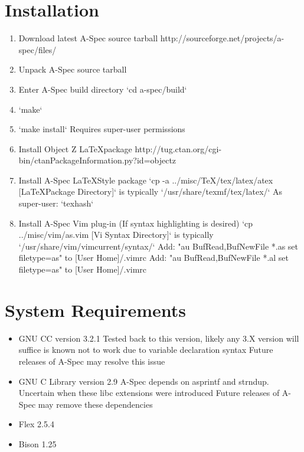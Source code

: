 \documentclass[letterpaper,10pt,draft]{book}
\begin{document}
\section{Installation}
   \label{sect:Install}

\begin{enumerate}
   \item Download latest A-Spec source tarball
      \subitem http://sourceforge.net/projects/a-spec/files/
   \item Unpack A-Spec source tarball
   \item Enter A-Spec build directory
      \subitem `cd a-spec/build`
   \item `make`
   \item `make install`
      \subitem Requires super-user permissions
   \item Install Object Z \LaTeX package
      \subitem http://tug.ctan.org/cgi-bin/ctanPackageInformation.py?id=objectz
   \item Install A-Spec \LaTeX Style package
      \subitem `cp -a ../misc/TeX/tex/latex/atex [\LaTeX Package Directory]`
       is typically `/usr/share/texmf/tex/latex/`
      \subitem As super-user: `texhash`
   \item Install A-Spec Vim plug-in (If syntax highlighting is desired)
      \subitem `cp ../misc/vim/as.vim [Vi Syntax Directory]`
       is typically `/usr/share/vim/vimcurrent/syntax/`
      \subitem Add: "au BufRead,BufNewFile *.as set filetype=as" to [User Home]/.vimrc
      \subitem Add: "au BufRead,BufNewFile *.al set filetype=as" to [User Home]/.vimrc
\end{enumerate}

\section{System Requirements}
   \label{sect:SysReq}

\begin{itemize}
   \item GNU CC version 3.2.1
      \subitem Tested back to this version, likely any 3.X version will suffice
       is known not to work due to variable declaration syntax
      \subitem Future releases of A-Spec may resolve this issue
   \item GNU C Library version 2.9
      \subitem A-Spec depends on asprintf and strndup.
      \subitem Uncertain when these libc extensions were introduced
      \subitem Future releases of A-Spec may remove these dependencies
   \item Flex 2.5.4
   \item Bison 1.25
\end{itemize}
\end{document}
